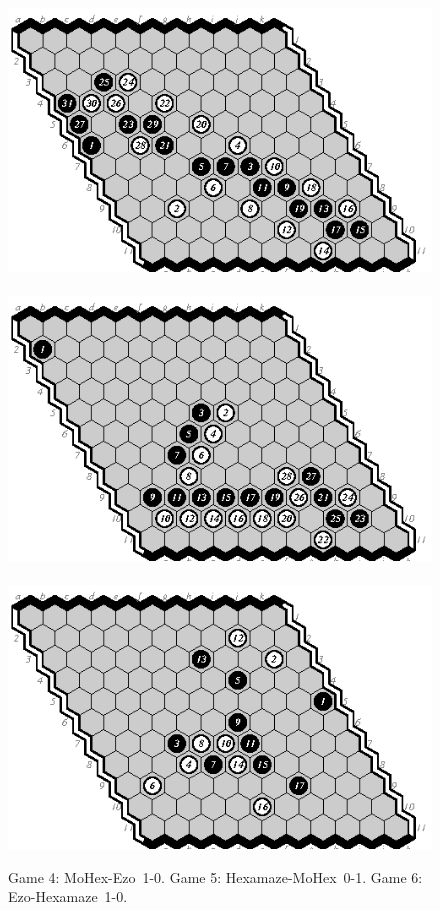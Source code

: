 \documentclass{icga}
\def\Eo{\mbox{\sc Ezo}}
\def\Hz{\mbox{\sc Hexamaze}}
\def\Mx{\mbox{\sc MoHex}}
\begin{document}
\begin{figure}[hbp]
\hspace*{-2.5cm}\
\includegraphics[scale=1.2]{games/pix/04-me-1-0.eps}\hspace*{-2cm}\
\includegraphics[scale=1.2]{games/pix/05-hm-0-1.eps}\hspace*{-2cm}\
\includegraphics[scale=1.2]{games/pix/06-eh-1-0.eps}
\caption{Game 4: \Mx-\Eo\ 1-0. Game 5: \Hz-\Mx\ 0-1. Game 6: \Eo-\Hz\ 1-0.}
\end{figure}
\end{document}
